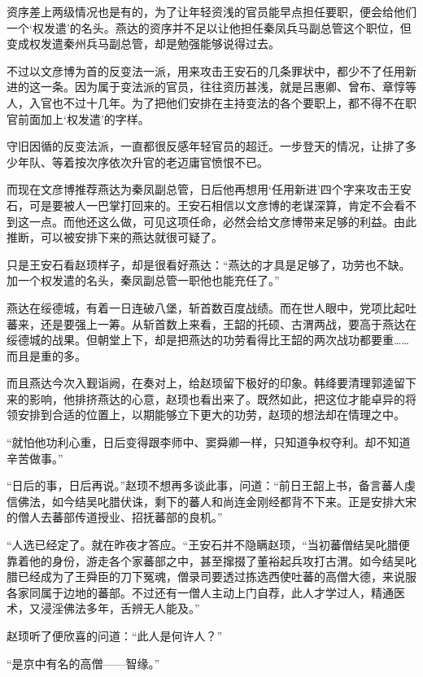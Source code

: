 资序差上两级情况也是有的，为了让年轻资浅的官员能早点担任要职，便会给他们一个‘权发遣’的名头。燕达的资序并不足以让他担任秦凤兵马副总管这个职位，但变成权发遣秦州兵马副总管，却是勉强能够说得过去。

不过以文彦博为首的反变法一派，用来攻击王安石的几条罪状中，都少不了任用新进的这一条。因为属于变法派的官员，往往资历甚浅，就是吕惠卿、曾布、章惇等人，入官也不过十几年。为了把他们安排在主持变法的各个要职上，都不得不在职官前面加上‘权发遣’的字样。

守旧因循的反变法派，一直都很反感年轻官员的超迁。一步登天的情况，让排了多少年队、等着按次序依次升官的老迈庸官愤恨不已。

而现在文彦博推荐燕达为秦凤副总管，日后他再想用‘任用新进’四个字来攻击王安石，可是要被人一巴掌打回来的。王安石相信以文彦博的老谋深算，肯定不会看不到这一点。而他还这么做，可见这项任命，必然会给文彦博带来足够的利益。由此推断，可以被安排下来的燕达就很可疑了。

只是王安石看赵顼样子，却是很看好燕达：“燕达的才具是足够了，功劳也不缺。加一个权发遣的名头，秦凤副总管一职他也能充任了。”

燕达在绥德城，有着一日连破八堡，斩首数百度战绩。而在世人眼中，党项比起吐蕃来，还是要强上一筹。从斩首数上来看，王韶的托硕、古渭两战，要高于燕达在绥德城的战果。但朝堂上下，却是把燕达的功劳看得比王韶的两次战功都要重……而且是重的多。

而且燕达今次入觐诣阙，在奏对上，给赵顼留下极好的印象。韩绛要清理郭逵留下来的影响，他排挤燕达的心意，赵顼也看出来了。既然如此，把这位才能卓异的将领安排到合适的位置上，以期能够立下更大的功劳，赵顼的想法却在情理之中。

“就怕他功利心重，日后变得跟李师中、窦舜卿一样，只知道争权夺利。却不知道辛苦做事。”

“日后的事，日后再说。”赵顼不想再多谈此事，问道：“前日王韶上书，备言蕃人虔信佛法，如今结吴叱腊伏诛，剩下的蕃人和尚连金刚经都背不下来。正是安排大宋的僧人去蕃部传道授业、招抚蕃部的良机。”

“人选已经定了。就在昨夜才答应。“王安石并不隐瞒赵顼，“当初蕃僧结吴叱腊便靠着他的身份，游走各个家蕃部之中，甚至撺掇了董裕起兵攻打古渭。如今结吴叱腊已经成为了王舜臣的刀下冤魂，僧录司要透过拣选西使吐蕃的高僧大德，来说服各家同属于边地的蕃部。不过还有一僧人主动上门自荐，此人才学过人，精通医术，又浸淫佛法多年，舌辨无人能及。”

赵顼听了便欣喜的问道：“此人是何许人？”

“是京中有名的高僧——智缘。”


